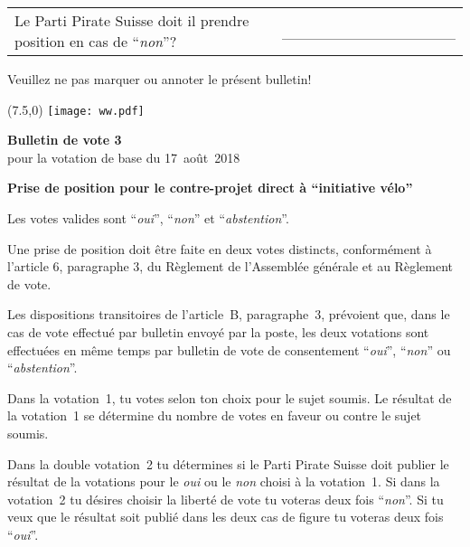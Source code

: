 \documentclass[11pt, a4paper]{scrartcl}
\newcommand{\votingdate}{17~août~2018}
\newcommand{\oui}{\enquote{\textit{oui}}}
\newcommand{\non}{\enquote{\textit{non}}}
\newcommand{\abstention}{\enquote{\textit{abstention}}}
\begin{document}
{\begin{minipage}[t][12.5cm][t]{17.7cm}
\vspace{0.5cm}

\begin{tabular}{ b{13.5cm} b{3cm} }
Le Parti Pirate Suisse doit il prendre position en cas de \non{}?
& \_\_\_\_\_\_\_\_\_\_\_\_\_\_\_\_ \\
\end{tabular}

\vspace{0.5cm}

Veuillez ne pas marquer ou annoter le présent bulletin!


\end{minipage}

\newpage

\begin{minipage}[t][12.5cm][t]{17.7cm}

\begin{textblock}{6}(7.5,0)
\texttt{[image: ww.pdf]}
\end{textblock}

{\LARGE\textbf{Bulletin de vote 3}} \\
pour la votation de base du \votingdate{} \\

\vspace{2cm}

\textbf{Prise de position pour le contre-projet direct à \enquote{initiative vélo}}

\vspace{0.2cm}
Les votes valides sont \oui{}, \non{} et \abstention{}.

\vspace{0.2cm}
Une prise de position doit être faite en deux votes distincts, conformément à l'article 6, paragraphe 3, du Règlement de l'Assemblée générale et au Règlement de vote.

\vspace{0.2cm}
Les dispositions transitoires de l'article~B, paragraphe~3, prévoient que, dans le cas de vote effectué par bulletin envoyé par la poste, les deux votations sont effectuées en même temps par bulletin de vote de consentement \oui{}, \non{} ou \abstention{}.

\vspace{0.2cm}
Dans la votation~1, tu votes selon ton choix pour le sujet soumis. Le résultat de la votation~1 se détermine du nombre de votes en faveur ou contre le sujet soumis.

\vspace{0.2cm}
Dans la double votation~2 tu détermines si le Parti Pirate Suisse doit publier le résultat de la votations pour le \textit{oui} ou le \textit{non} choisi à la votation~1. Si dans la votation~2 tu désires choisir la liberté de vote tu voteras deux fois \non{}. Si tu veux que le résultat soit publié dans les deux cas de figure tu voteras deux fois \oui{}.


\end{minipage}}
\end{document}
